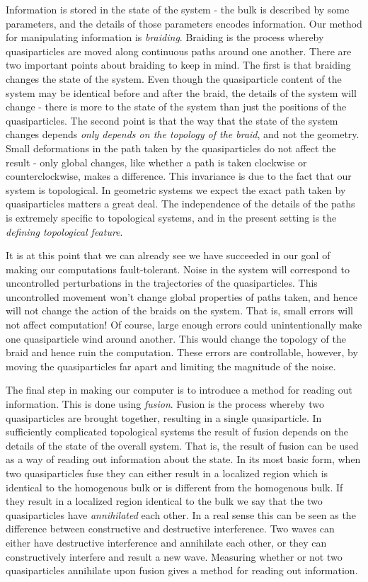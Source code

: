 \documentclass{article}
\theoremstyle{definition}
\numberwithin{figure}{section}
\begin{document}
Information is stored in the state of the system - the bulk is described by some parameters, and the details of those parameters encodes information. Our method for manipulating information is \textit{braiding}. Braiding is the process whereby quasiparticles are moved along continuous paths around one another. There are two important points about braiding to keep in mind. The first is that braiding changes the state of the system. Even though the quasiparticle content of the system may be identical before and after the braid, the details of the system will change - there is more to the state of the system than just the positions of the quasiparticles. The second point is that the way that the state of the system changes depends \textit{only depends on the topology of the braid}, and not the geometry. Small deformations in the path taken by the quasiparticles do not affect the result - only global changes, like whether a path is taken clockwise or counterclockwise, makes a difference. This invariance is due to the fact that our system is topological. In geometric systems we expect the exact path taken by quasiparticles matters a great deal. The independence of the details of the paths is extremely specific to topological systems, and in the present setting is the \textit{defining topological feature}.

It is at this point that we can already see we have succeeded in our goal of making our computations fault-tolerant. Noise in the system will correspond to uncontrolled perturbations in the trajectories of the quasiparticles. This uncontrolled movement won’t change global properties of paths taken, and hence will not change the action of the braids on the system. That is, small errors will not affect computation! Of course, large enough errors could unintentionally make one quasiparticle wind around another. This would change the topology of the braid and hence ruin the computation. These errors are controllable, however, by moving the quasiparticles far apart and limiting the magnitude of the noise.

The final step in making our computer is to introduce a method for reading out information. This is done using \textit{fusion}. Fusion is the process whereby two quasiparticles are brought together, resulting in a single quasiparticle. In sufficiently complicated topological systems the result of fusion depends on the details of the state of the overall system. That is, the result of fusion can be used as a way of reading out information about the state. In its most basic form, when two quasiparticles fuse they can either result in a localized region which is identical to the homogenous bulk or is different from the homogenous bulk. If they result in a localized region identical to the bulk we say that the two quasiparticles have \textit{annihilated} each other. In a real sense this can be seen as the difference between constructive and destructive interference. Two waves can either have destructive interference and annihilate each other, or they can constructively interfere and result a new wave. Measuring whether or not two quasiparticles annihilate upon fusion gives a method for reading out information.
\end{document}
